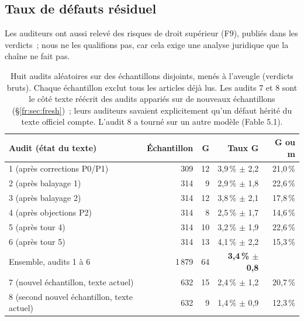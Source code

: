 \documentclass[11pt,a4paper]{article}
\begin{document}
\subsection{Taux de défauts résiduel}
Les auditeurs ont aussi relevé des risques de droit supérieur (F9), publiés dans les verdicts~; nous ne les qualifions pas, car cela exige une analyse juridique que la chaîne ne fait pas.

\begin{table}[ht]
\centering
\small
\begin{tabular}{lrrrr}
\toprule
Audit (état du texte) & Échantillon & G & Taux G & G ou m\\
\midrule
1 (après corrections P0/P1) & 309 & 12 & 3,9\,\% $\pm$ 2,2 & 21,0\,\%\\
2 (après balayage 1) & 314 & 9 & 2,9\,\% $\pm$ 1,8 & 22,6\,\%\\
3 (après balayage 2) & 314 & 12 & 3,8\,\% $\pm$ 2,1 & 17,8\,\%\\
4 (après objections P2) & 314 & 8 & 2,5\,\% $\pm$ 1,7 & 14,6\,\%\\
5 (après tour 4) & 314 & 10 & 3,2\,\% $\pm$ 1,9 & 22,6\,\%\\
6 (après tour 5) & 314 & 13 & 4,1\,\% $\pm$ 2,2 & 15,3\,\%\\
\midrule
Ensemble, audits 1 à 6 & 1\,879 & 64 & \textbf{3,4\,\% $\pm$ 0,8} & \\
\midrule
7 (nouvel échantillon, texte actuel) & 632 & 15 & 2,4\,\% $\pm$ 1,2 & 20,7\,\%\\
8 (second nouvel échantillon, texte actuel) & 632 & 9 & 1,4\,\% $\pm$ 0,9 & 12,3\,\%\\
\bottomrule
\end{tabular}
\caption{Huit audits aléatoires sur des échantillons disjoints, menés à l'aveugle (verdicts bruts). Chaque échantillon exclut tous les articles déjà lus. Les audits 7 et 8 sont le côté \og texte réécrit \fg{} des audits appariés sur de nouveaux échantillons (\S\ref{fr:sec:fresh})~; leurs auditeurs savaient explicitement qu'un défaut hérité du texte officiel compte. L'audit 8 a tourné sur un autre modèle (Fable 5.1).}
\label{fr:tab:audits}
\end{table}
\end{document}
